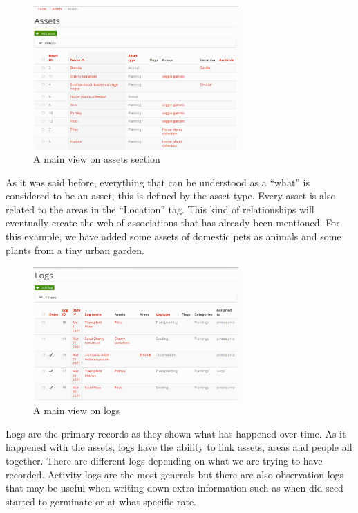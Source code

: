 \begin{figure}[htp]
    \centering
    \includegraphics[width=0.70\textwidth]{fig/assets.png}
    \caption{A main view on assets section}
    \label{fig:assets}
\end{figure}
As it was said before, everything that can be understood as a ``what'' is considered to be an asset, this is defined by the asset type. Every asset is also related to the areas in the ``Location'' tag. This kind of relationships will eventually create the web of associations that has already been mentioned. For this example, we have added some assets of domestic pets as animals and some plants from a tiny urban garden.

\newpage

\begin{figure}[htp]
    \centering
    \includegraphics[width=0.70\textwidth]{fig/logs.png}
    \caption{A main view on logs}
    \label{fig:logs}
\end{figure}

Logs are the primary records as they shown what has happened over time. As it happened with the assets, logs have the ability to link assets, areas and people all together. There are different logs depending on what we are trying to have recorded. Activity logs are the most generals but there are also observation logs that may be useful when writing down extra information such as when did seed started to germinate or at what specific rate.



